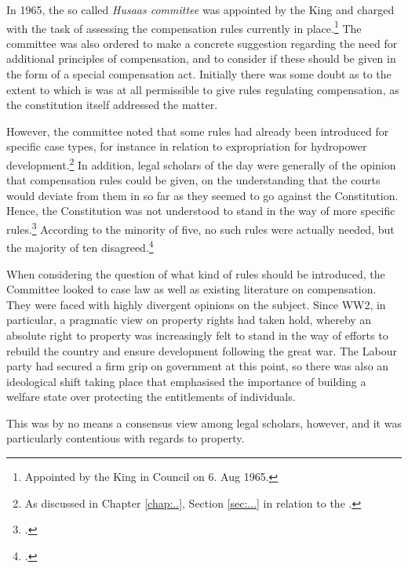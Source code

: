 {In 1965, the so called \emph{Husaas committee} was appointed by the King and charged with the task of assessing the compensation rules currently in place.\footnote{Appointed by the King in Council on 6. Aug 1965.} The committee was also ordered to make a concrete suggestion regarding the need for additional principles of compensation, and to consider if these should be given in the form of a special compensation act. Initially there was some doubt as to the extent to which is was at all permissible to give rules regulating compensation, as the constitution itself addressed the matter. 

However, the committee noted that some rules had already been introduced for specific case types, for instance in relation to expropriation for hydropower development.\footnote{As discussed in Chapter \ref{chap:..}, Section \ref{sec:...} in relation to the \cite[16]{wra17}.} In addition, legal scholars of the day were generally of the opinion that compensation rules could be given, on the understanding that the courts would deviate from them in so far as they seemed to go against the Constitution. Hence, the Constitution was not understood to stand in the way of more specific rules.\footnote{\cite[136-137]{nut69}.} According to the minority of five, no such rules were actually needed, but the majority of ten disagreed.\footcite[137]{nut69} }

When considering the question of what kind of rules should be introduced, the Committee looked to case law as well as existing literature on compensation. They were faced with highly divergent opinions on the subject. Since WW2, in particular, a pragmatic view on property rights had taken hold, whereby an absolute right to property was increasingly felt to stand in the way of efforts to rebuild the country and ensure development following the great war. The Labour party had secured a firm grip on government at this point, so there was also an ideological shift taking place that emphasised the importance of building a welfare state over protecting the entitlements of individuals.

This was by no means a consensus view among legal scholars, however, and it was particularly contentious with regards to property. 




